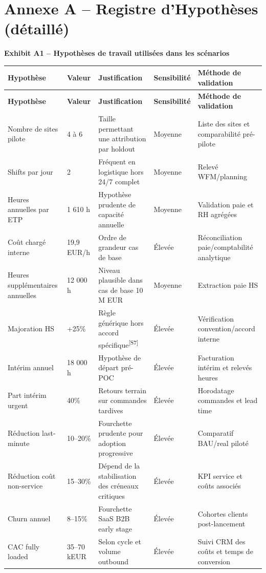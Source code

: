 \documentclass[11pt,a4paper]{article}
\newcommand{\srcref}[1]{\textsuperscript{\textcolor{PraedixaBlue}{[#1]}}}
\newcommand{\exhibit}[1]{\vspace{2mm}\noindent\colorbox{PraedixaLight}{\parbox{\dimexpr\linewidth-2\fboxsep\relax}{\textbf{#1}}}\vspace{1mm}}
\begin{document}
\section{Annexe A -- Registre d'Hypothèses (détaillé)}
\exhibit{Exhibit A1 -- Hypothèses de travail utilisées dans les scénarios}
\small
\begin{longtable}{@{}p{3.3cm}p{2.1cm}p{3.7cm}p{2.1cm}p{4.2cm}@{}}
\toprule
\textbf{Hypothèse} & \textbf{Valeur} & \textbf{Justification} & \textbf{Sensibilité} & \textbf{Méthode de validation} \\
\midrule
\endfirsthead
\toprule
\textbf{Hypothèse} & \textbf{Valeur} & \textbf{Justification} & \textbf{Sensibilité} & \textbf{Méthode de validation} \\
\midrule
\endhead
Nombre de sites pilote & 4 à 6 & Taille permettant une attribution par holdout & Moyenne & Liste des sites et comparabilité pré-pilote \\
Shifts par jour & 2 & Fréquent en logistique hors 24/7 complet & Moyenne & Relevé WFM/planning \\
Heures annuelles par ETP & 1 610 h & Hypothèse prudente de capacité annuelle & Moyenne & Validation paie et RH agrégées \\
Coût chargé interne & 19,9 EUR/h & Ordre de grandeur cas de base & Élevée & Réconciliation paie/comptabilité analytique \\
Heures supplémentaires annuelles & 12 000 h & Niveau plausible dans cas de base 10 M EUR & Moyenne & Extraction paie HS \\
Majoration HS & +25\% & Règle générique hors accord spécifique\srcref{S7} & Élevée & Vérification convention/accord interne \\
Intérim annuel & 18 000 h & Hypothèse de départ pré-POC & Élevée & Facturation intérim et relevés heures \\
Part intérim urgent & 40\% & Retours terrain sur commandes tardives & Élevée & Horodatage commandes et lead time \\
Réduction last-minute & 10--20\% & Fourchette prudente pour adoption progressive & Élevée & Comparatif BAU/real piloté \\
Réduction coût non-service & 15--30\% & Dépend de la stabilisation des créneaux critiques & Élevée & KPI service et coûts associés \\
Churn annuel & 8--15\% & Fourchette SaaS B2B early stage & Élevée & Cohortes clients post-lancement \\
CAC fully loaded & 35--70 kEUR & Selon cycle et volume outbound & Élevée & Suivi CRM des coûts et temps de conversion \\
\bottomrule
\end{longtable}
\normalsize
\end{document}
